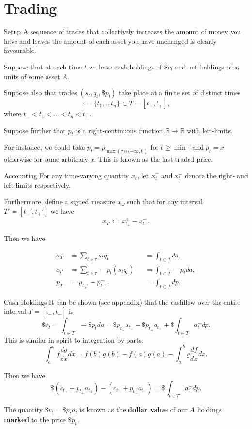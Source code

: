 \documentclass{beamer}
\begin{document}
\section{Trading}
\begin{frame}{Setup}
	A sequence of trades that collectively increases the amount of money you have and leaves the amount of each asset you have unchanged is clearly favourable.

	\pause

	Suppose that at each time $t$ we have cash holdings of $\$c_t$ and net holdings of $a_t$ units of some asset $A$.

	Suppose also that trades $(s_t, q_t, \$p_t)$ take place at a finite set of distinct times
	$$\tau = \{t_1,\ldots t_n\}\subset T = [t_-, t_+],$$
	where $t_-<t_1<\ldots<t_n<t_+$.

	\pause

	Suppose further that $p_t$ is a right-continuous function $\mathbb R\to\mathbb R$ with left-limits.

	For instance, we could take $p_t = p_{\max \left(\tau\cap (-\infty,t]\right)}$ for $t\geq \min\tau$ and $p_t=x$ otherwise for some arbitrary $x$. This is known as the last traded price.
\end{frame}

\begin{frame}{Accounting}
	For any time-varying quantity $x_t$, let $x_t^+$ and $x_t^-$ denote the right- and left-limits respectively.

	Furthermore, define a signed measure $x_\omega$ such that for any interval $T'=[t_-',t_+']$ we have
	$$x_{T'} := x_{t_+}^+ - x_{t_-}^-.$$

	\pause

	Then we have

	\vspace{-0.06\textheight}
	\begin{align*}
		a_{T'}	&= \sum_{t\in \tau} s_t q_t		&&= \int_{t\in T} da,
	\\	c_{T'}	&= \sum_{t\in \tau} - p_t (s_t q_t)	&&= \int_{t\in T} - p_t da,
	\\	p_{T'}	&= p_{t_+'} - p_{t_-'}^-.		&&= \int_{t\in T} dp.
	\end{align*}%
\end{frame}

\begin{frame}{Cash Holdings}
	It can be shown (see appendix) that the cashflow over the entire interval $T=[t_-,t_+]$ is
	$$\$c_T = \int_{t\in T} - \$p_t da = \$p_{t_-}a_{t_-} - \$p_{t_+}a_{t_+} + \$\int_{t\in T} a_t^- dp.$$
	This is similar in spirit to integration by parts:
	$$\int_a^b f \frac{dg}{dx} dx = f(b)g(b)-f(a)g(a) - \int_a^b g \frac{df}{dx} dx.$$

	Then we have
	$$\$(c_{t_+} + p_{t_+}a_{t_+}) - (c_{t_-} + p_{t_-}a_{t_-}) = \$\int_{t\in T} a_t^- dp.$$

	The quantity $\$v_t = \$p_t a_t$ is known as the \textbf{dollar value} of our $A$ holdings \textbf{marked} to the price $\$p_t$.%
\end{frame}
\end{document}
